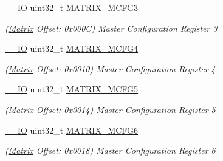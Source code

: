 \begin{DoxyCompactItemize}
\mbox{\label{structMatrix_a7c98002b68ad95570a0c02b83b2abdef}} 
\mbox{\hyperlink{core__cm7_8h_aec43007d9998a0a0e01faede4133d6be}{\+\_\+\+\_\+\+IO}} uint32\+\_\+t \mbox{\hyperlink{structMatrix_a7c98002b68ad95570a0c02b83b2abdef}{M\+A\+T\+R\+I\+X\+\_\+\+M\+C\+F\+G3}}
\begin{DoxyCompactList}\small\item\em (\mbox{\hyperlink{structMatrix}{Matrix}} Offset\+: 0x000C) Master Configuration Register 3 \end{DoxyCompactList}\item 
\mbox{\label{structMatrix_aff6cd21542143e01cc99cc3a8eb38100}} 
\mbox{\hyperlink{core__cm7_8h_aec43007d9998a0a0e01faede4133d6be}{\+\_\+\+\_\+\+IO}} uint32\+\_\+t \mbox{\hyperlink{structMatrix_aff6cd21542143e01cc99cc3a8eb38100}{M\+A\+T\+R\+I\+X\+\_\+\+M\+C\+F\+G4}}
\begin{DoxyCompactList}\small\item\em (\mbox{\hyperlink{structMatrix}{Matrix}} Offset\+: 0x0010) Master Configuration Register 4 \end{DoxyCompactList}\item 
\mbox{\label{structMatrix_a27547437b40707bebba2b174a68d817d}} 
\mbox{\hyperlink{core__cm7_8h_aec43007d9998a0a0e01faede4133d6be}{\+\_\+\+\_\+\+IO}} uint32\+\_\+t \mbox{\hyperlink{structMatrix_a27547437b40707bebba2b174a68d817d}{M\+A\+T\+R\+I\+X\+\_\+\+M\+C\+F\+G5}}
\begin{DoxyCompactList}\small\item\em (\mbox{\hyperlink{structMatrix}{Matrix}} Offset\+: 0x0014) Master Configuration Register 5 \end{DoxyCompactList}\item 
\mbox{\label{structMatrix_afd1667547dc5d3dfe33c4d5259aff57d}} 
\mbox{\hyperlink{core__cm7_8h_aec43007d9998a0a0e01faede4133d6be}{\+\_\+\+\_\+\+IO}} uint32\+\_\+t \mbox{\hyperlink{structMatrix_afd1667547dc5d3dfe33c4d5259aff57d}{M\+A\+T\+R\+I\+X\+\_\+\+M\+C\+F\+G6}}
\begin{DoxyCompactList}\small\item\em (\mbox{\hyperlink{structMatrix}{Matrix}} Offset\+: 0x0018) Master Configuration Register 6 \end{DoxyCompactList}\item 
\mbox{\label{structMatrix_a42befdb66ebde4f45a2035ce8e024bff}} 

\end{DoxyCompactItemize}
